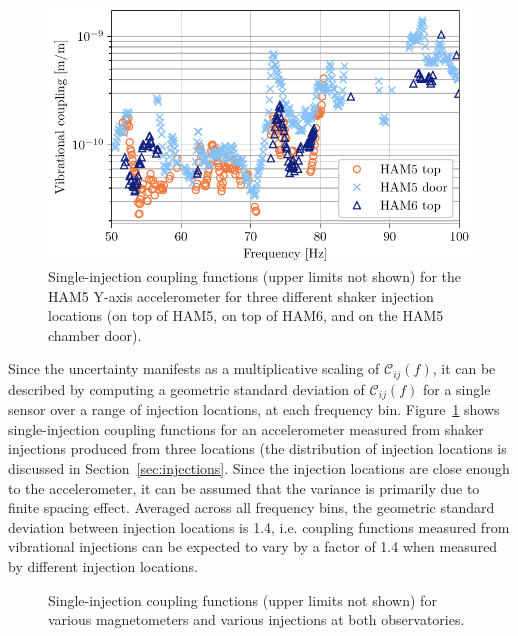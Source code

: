 \begin{figure}[h!]
	\centering
	\includegraphics[width=\textwidth]{figures/noise-methods/cf-locations-vib.pdf}
	\caption{
		Single-injection coupling functions (upper limits not shown) for the HAM5 Y-axis accelerometer for three different shaker injection locations (on top of HAM5, on top of HAM6, and on the HAM5 chamber door).}
	\label{fig:cf-locations-vib}
\end{figure}

Since the uncertainty manifests as a multiplicative scaling of $\mathcal{C}_{ij}(f)$, it can be described by computing a geometric standard deviation of $\mathcal{C}_{ij}(f)$ for a single sensor over a range of injection locations, at each frequency bin.
Figure~\ref{fig:cf-locations-vib} shows single-injection coupling functions for an accelerometer measured from shaker injections produced from three locations (the distribution of injection locations is discussed in Section~\ref{sec:injections}.
Since the injection locations are close enough to the accelerometer, it can be assumed that the variance is primarily due to finite spacing effect.
Averaged across all frequency bins, the geometric standard deviation between injection locations is 1.4, i.e. coupling functions measured from vibrational injections can be expected to vary by a factor of 1.4 when measured by different injection locations.

\begin{figure}[h!]
	\centering
	\caption{
		Single-injection coupling functions (upper limits not shown) for various magnetometers and various injections at both observatories.}
	\label{fig:cf-locations-mag}
\end{figure}

